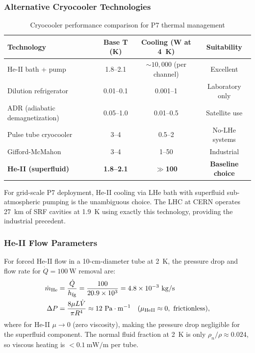 \documentclass[aps,prd,twocolumn,superscriptaddress]{revtex4-2}
\begin{document}
\subsubsection{Alternative Cryocooler Technologies}

\begin{table}[h]
\centering
\caption{Cryocooler performance comparison for P7 thermal management}
\label{tab:cryocoolers}
\begin{tabular}{lccc}
\toprule
Technology & Base T (K) & Cooling (W at 4~K) & Suitability \\
\midrule
He-II bath + pump & 1.8--2.1 & $\sim10{,}000$ (per channel) & Excellent \\
Dilution refrigerator & 0.01--0.1 & 0.001--1 & Laboratory only \\
ADR (adiabatic demagnetization) & 0.05--1.0 & 0.01--0.5 & Satellite use \\
Pulse tube cryocooler & 3--4 & 0.5--2 & No-LHe systems \\
Gifford-McMahon & 3--4 & 1--50 & Industrial \\
\midrule
\textbf{He-II (superfluid)} & \textbf{1.8--2.1} & \textbf{$\gg$100} & \textbf{Baseline choice} \\
\bottomrule
\end{tabular}
\end{table}

For grid-scale P7 deployment, He-II cooling via LHe bath with
superfluid sub-atmospheric pumping is the unambiguous choice.  The LHC
at CERN operates 27~km of SRF cavities at 1.9~K using exactly this
technology, providing the industrial precedent.

\subsubsection{He-II Flow Parameters}

For forced He-II flow in a 10-cm-diameter tube at 2~K, the pressure
drop and flow rate for $\dot{Q} = 100~\mathrm{W}$ removal are:
\begin{align}
\dot{m}_{\rm He} &= \frac{\dot{Q}}{h_{\rm fg}}
= \frac{100}{20.9\times 10^3} = 4.8\times 10^{-3}~\mathrm{kg/s}\\
\Delta P &= \frac{8\mu L \dot{V}}{\pi R^4}
\approx 12~\mathrm{Pa}\cdot\mathrm{m}^{-1}
\quad (\mu_{\rm HeII} \approx 0,~\text{frictionless}),
\end{align}
where for He-II $\mu \to 0$ (zero viscosity), making the pressure drop
negligible for the superfluid component.  The normal fluid fraction at
2~K is only $\rho_n/\rho \approx 0.024$, so viscous heating is
$< 0.1~\mathrm{mW/m}$ per tube.
\end{document}
